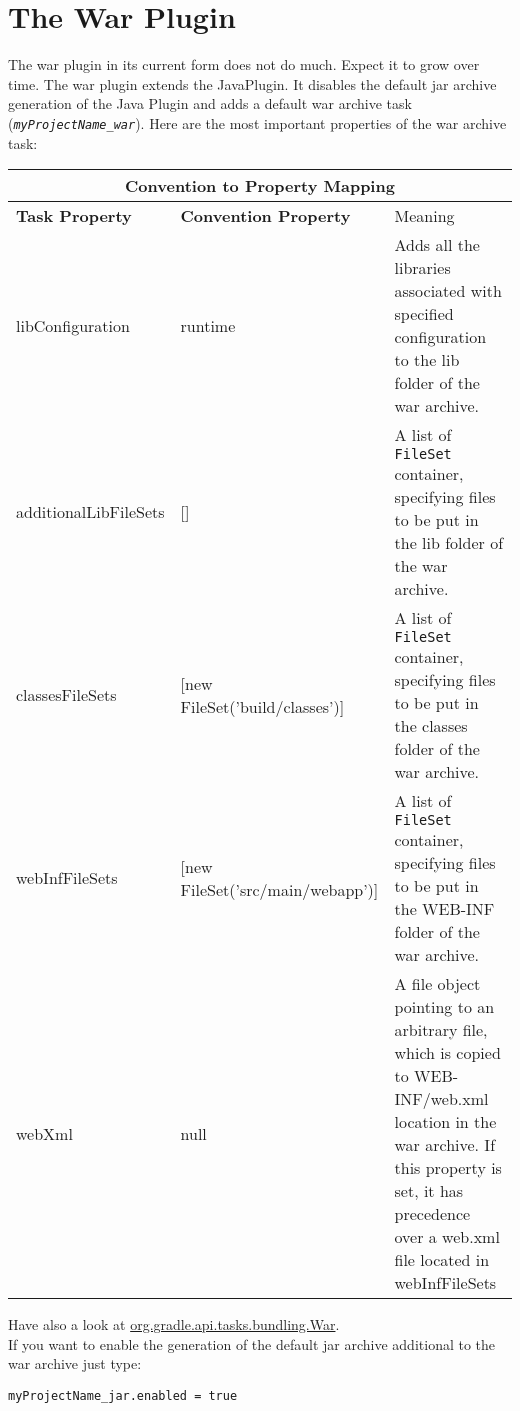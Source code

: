 \chapter{The War Plugin} %
\label{cha:the_war_plugin}
The war plugin in its current form does not do much. Expect it to grow over time. The war plugin extends the JavaPlugin. It disables the default jar archive generation of the Java Plugin and adds a default war archive task (\texttt{\emph{myProjectName\_war}}). Here are the most important properties of the war archive task:
\begin{center}
	\begin{tabular}{|l|l|l|} \hline
		\multicolumn{3}{|c|}{Convention to Property Mapping} \\ \hline
	    \textbf{Task Property} & \textbf{Convention Property} & Meaning \\ \hline
		libConfiguration & runtime &  Adds all the libraries associated with specified configuration to the lib folder of the war archive.\\ \hline
		additionalLibFileSets & [] & A list of \texttt{FileSet} container, specifying files to be put in the lib folder of the war archive. \\ \hline
		classesFileSets & [new FileSet('build/classes')] & A list of \texttt{FileSet} container, specifying files to be put in the classes folder of the war archive.\\ \hline
		webInfFileSets & [new FileSet('src/main/webapp')] & A list of \texttt{FileSet} container, specifying files to be put in the WEB-INF folder of the war archive.\\ \hline
		webXml & null & A file object pointing to an arbitrary file, which is copied to WEB-INF/web.xml location in the war archive. If this property is set, it has precedence over a web.xml file located in webInfFileSets\\ \hline
	\end{tabular} 
\end{center}
Have also a look at \href{\API tasks/bundling/War.html}{org.gradle.api.tasks.bundling.War}.
\\

\noindent If you want to enable the generation of the default jar archive additional to the war archive just type:
\begin{Verbatim}
myProjectName_jar.enabled = true
\end{Verbatim}
